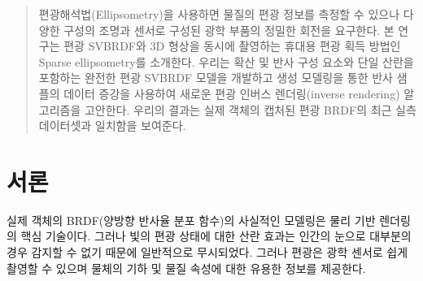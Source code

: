 \documentclass[a4paper,twocolumn]{article}
\begin{document}
\begin{abstract}
편광해석법(Ellipsometry)을 사용하면 물질의 편광 정보를 측정할 수 있으나 다양한 구성의 조명과 센서로 구성된 광학 부품의 정밀한 회전을 요구한다. 
본 연구는 편광 SVBRDF와 3D 형상을 동시에 촬영하는 휴대용 편광 획득 방법인 Sparse ellipsometry를 소개한다. 
우리는 확산 및 반사 구성 요소와 단일 산란을 포함하는 완전한 편광 SVBRDF 모델을 개발하고 생성 모델링을 통한 반사 샘플의 데이터 증강을 사용하여 새로운 편광 인버스 렌더링(inverse rendering) 알고리즘을 고안한다. 우리의 결과는 실제 객체의 캡처된 편광 BRDF의 최근 실측 데이터셋과 일치함을 보여준다.

\end{abstract}

%
%


\maketitle


\section{서론}
\label{sec:introduction}
실제 객체의 BRDF(양방향 반사율 분포 함수)의 사실적인 모델링은 물리 기반 렌더링의 핵심 기술이다.
그러나 빛의 편광 상태에 대한 산란 효과는 인간의 눈으로 대부분의 경우 감지할 수 없기 때문에 일반적으로 무시되었다.
그러나 편광은 광학 센서로 쉽게 촬영할 수 있으며 물체의 기하 및 물질 속성에 대한 유용한 정보를 제공한다.
\end{document}
